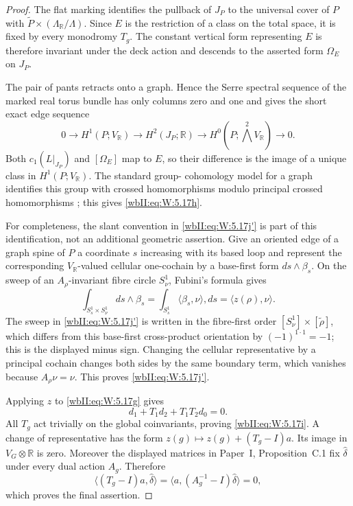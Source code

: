 \begin{proof}
The flat marking identifies the pullback of $J_P$ to the universal cover of
$P$ with
$\widetilde P\times(\Lambda_{\mathbb R}/\Lambda)$.  Since $E$ is the
restriction of a class on the total space, it is fixed by every monodromy
$T_g$.  The constant vertical form representing $E$ is therefore invariant
under the deck action and descends to the asserted form $\Omega_E$ on
$J_P$.

The pair of pants retracts onto a graph.  Hence the Serre spectral sequence
of the marked real torus bundle has only columns zero and one and gives the
short exact edge sequence
\[
0\longrightarrow H^1(P;V_{\mathbb R})
 \longrightarrow H^2(J_P;\mathbb R)
 \longrightarrow H^0(P;\textstyle\bigwedge^2V_{\mathbb R})
 \longrightarrow0.
\tag{W.27}\label{wbII:eq:W:5.17j}
\]
Both $c_1(L|_{J_P})$ and $[\Omega_E]$ map to $E$, so their difference is
the image of a unique class in $H^1(P;V_{\mathbb R})$.  The standard group-
cohomology model for a graph identifies this group with crossed
homomorphisms modulo principal crossed homomorphisms
\cite[Chapter~I, \S5]{Brown1982}; this gives \eqref{wbII:eq:W:5.17h}.

For completeness, the slant convention in \eqref{wbII:eq:W:5.17j'} is part of this
identification, not an additional geometric assertion.  Give an oriented
edge of a graph spine of $P$ a coordinate $s$ increasing with its based
loop and represent the corresponding $V_{\mathbb R}$-valued cellular
one-cochain by a base-first form $ds\wedge\beta_s$.  On the sweep of an
$A_\rho$-invariant fibre circle $S^1_\nu$, Fubini's formula gives
\[
\int_{S^1_s\times S^1_\nu}ds\wedge\beta_s
 =\int_{S^1_s}\langle\beta_s,\nu\rangle,ds
 =\langle z(\rho),\nu\rangle.
\]
The sweep in \eqref{wbII:eq:W:5.17j'} is written in the fibre-first order
$[S^1_\nu]\times[\widetilde\rho]$, which differs from this base-first
cross-product orientation by $(-1)^{1\cdot1}=-1$; this is the displayed
minus sign.
Changing the cellular representative by a principal cochain changes both
sides by the same boundary term, which vanishes because $A_\rho\nu=\nu$.
This proves \eqref{wbII:eq:W:5.17j'}.

Applying $z$ to \eqref{wbII:eq:W:5.17g} gives
\[
 d_1+T_1d_2+T_1T_2d_0=0.
\]
All $T_g$ act trivially on the global coinvariants, proving \eqref{wbII:eq:W:5.17i}.  A
change of representative has the form
$z(g)\mapsto z(g)+(T_g-I)a$.  Its image in $V_G\otimes\mathbb R$ is zero.
Moreover the displayed matrices in
Paper~I, Proposition~C.1 fix $\widehat\delta$ under every dual
action $A_g$.  Therefore
\[
 \langle(T_g-I)a,\widehat\delta\rangle
 =\langle a,(A_g^{-1}-I)\widehat\delta\rangle=0,
\]
which proves the final assertion.
\end{proof}

